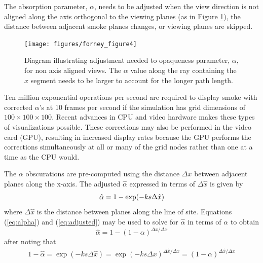 The absorption parameter, $\alpha$, needs to be adjusted when the
view direction is not aligned along the axis orthogonal to the
viewing planes (as in Figure \ref{figray}), the distance between
adjacent smoke planes changes, or viewing planes are skipped.
\begin{figure}[\figoptions]
\centerline{\texttt{[image: figures/forney\_figure4]}}
\caption [Diagram illustrating the adjustment needed to opaqueness
parameter, $\alpha$, for non axis aligned views.] { Diagram
illustrating adjustment needed to opaqueness parameter, $\alpha$,
for non axis aligned views. The $\alpha$ value along the ray
containing the $\hat{x}$ segment needs to be larger to account for
the longer path length. } \label{figray}
\end{figure}

Ten million exponential operations per second are required to
display smoke with corrected $\alpha$'s at 10 frames per second if
the simulation has grid dimensions of $100\times 100\times 100$.
Recent advances in CPU and video hardware makes these types of
visualizations possible. These corrections may also be performed
in the video card (GPU), resulting in increased display rates
because the GPU performs the corrections simultaneously at all or
many of the grid nodes rather than one at a time as the CPU would.

The $\alpha$ obscurations are pre-computed using the distance
$\Delta x$ between adjacent planes along the x-axis. The adjusted
$\hat{\alpha}$ expressed in terms of $\Delta\hat{x}$ is given by
\begin{equation}
\label{eq:adjusted}
\hat{\alpha}=1-\exp(-ks\Delta \hat{x})\\
\end{equation}
where $\Delta\hat{x}$ is the distance between planes along the line of site.
Equations (\ref{eq:alpha}) and (\ref{eq:adjusted}) may be used to
solve for $\hat{\alpha}$ in terms of $\alpha$ to obtain
\begin{equation}
\label{eq:alphahat}
\hat{\alpha}=1-(1-\alpha)^{\Delta\hat{x}/\Delta x}
\end{equation}
after noting that
\begin{eqnarray*}
1-\hat{\alpha}=\exp(-ks\Delta\hat{x})=\exp(-ks\Delta
x)^{\Delta\hat{x}/\Delta x}=(1-\alpha)^{\Delta\hat{x}/\Delta x}
\end{eqnarray*}

